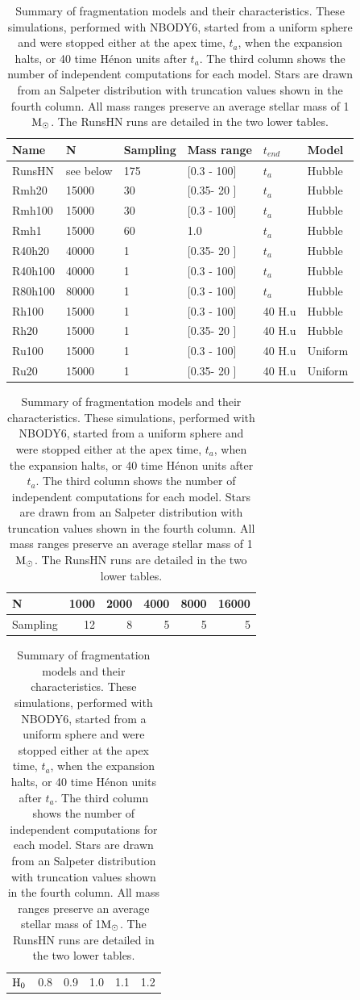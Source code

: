 \begin{table}
\begin{center}
\caption{Summary of fragmentation models and their characteristics. These simulations, performed with NBODY6, started from a uniform sphere and were stopped either at the apex time, $t_a$, when the expansion halts, or 40 time H\'enon units after $t_a$. The third column shows the number of independent computations for each model. Stars are drawn from an Salpeter distribution with truncation values shown in the fourth column. All mass ranges preserve an average stellar mass of 1${\textrm{M}_\odot}$. The RunsHN runs are detailed in the two lower tables.}
\label{Tab:2_models}
\begin{tabularx}{0.8\textwidth}{XXXXXX}
\hline
Name & N & Sampling & Mass range & $t_{end}$ & Model \\
\hline
RunsHN & see below & 175 & [0.3 - 100] & $t_a$ & Hubble \\
Rmh20 & 15000 & 30 & [0.35- 20 ] & $t_a$ & Hubble\\
Rmh100 & 15000 & 30 & [0.3 - 100] & $t_a$ & Hubble\\
Rmh1 & 15000 & 60 & 1.0  & $t_a$ & Hubble \\
R40h20 & 40000 & 1 & [0.35- 20 ] & $t_a$ & Hubble \\
R40h100 & 40000 & 1 & [0.3 - 100]& $t_a$ & Hubble \\
R80h100 & 80000 & 1 & [0.3 - 100] & $t_a$ & Hubble\\
Rh100 & 15000 & 1 & [0.3 - 100] & 40 H.u & Hubble \\
Rh20 & 15000 & 1 & [0.35- 20 ] & 40 H.u & Hubble\\
Ru100 & 15000 & 1 & [0.3 - 100]& 40 H.u & Uniform\\
Ru20 & 15000 & 1 & [0.35- 20 ] & 40 H.u & Uniform\\
\hline
\end{tabularx}
\end{center}
\begin{center}
\begin{tabular}{l|rrrrr}
\centering
N   & 1000 & 2000 & 4000 & 8000 & 16000\\ 
\hline
Sampling & 12 & 8 & 5 & 5 & 5\\
\end{tabular}
\end{center}
\begin{center}
\begin{tabular}{l|rrrrr}
${\textrm{H}}_0$ & 0.8 & 0.9 & 1.0 & 1.1 & 1.2
\end{tabular}
\end{center}
\end{table}

